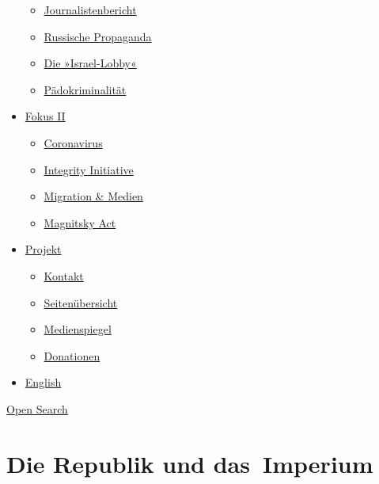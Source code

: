 \begin{itemize}
  \begin{itemize}
  \tightlist
  \item
    \href{https://swprs.org/bericht-eines-journalisten/}{Journalistenbericht}
  \item
    \href{https://swprs.org/russische-propaganda/}{Russische Propaganda}
  \item
    \href{https://swprs.org/die-israel-lobby-fakten-und-mythen/}{Die
    »Israel-Lobby«}
  \item
    \href{https://swprs.org/geopolitik-und-paedokriminalitaet/}{Pädokriminalität}
  \end{itemize}
\item
  \href{https://swprs.org/migration-und-medien/}{Fokus II}

  \begin{itemize}
  \tightlist
  \item
    \href{https://swprs.org/covid-19-hinweis-ii/}{Coronavirus}
  \item
    \href{https://swprs.org/die-integrity-initiative/}{Integrity
    Initiative}
  \item
    \href{https://swprs.org/migration-und-medien/}{Migration \& Medien}
  \item
    \href{https://swprs.org/der-fall-magnitsky/}{Magnitsky Act}
  \end{itemize}
\item
  \href{https://swprs.org/kontakt/}{Projekt}

  \begin{itemize}
  \tightlist
  \item
    \href{https://swprs.org/kontakt/}{Kontakt}
  \item
    \href{https://swprs.org/uebersicht/}{Seitenübersicht}
  \item
    \href{https://swprs.org/medienspiegel/}{Medienspiegel}
  \item
    \href{https://swprs.org/donationen/}{Donationen}
  \end{itemize}
\item
  \href{https://swprs.org/contact/}{English}
\end{itemize}

\protect\hyperlink{}{Open Search}

\hypertarget{die-republik-und-das-imperium}{%
\section{Die Republik und
das~Imperium}\label{die-republik-und-das-imperium}}

